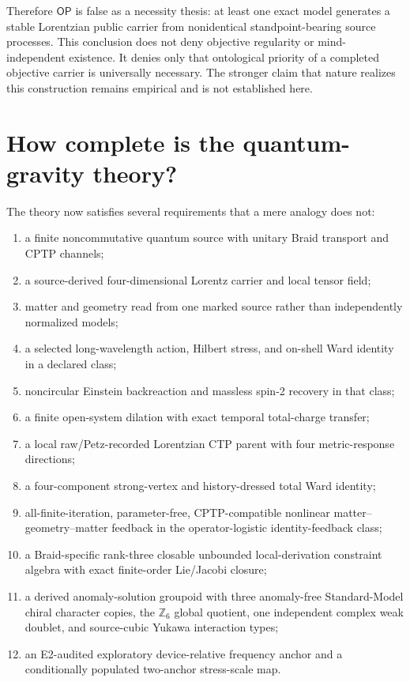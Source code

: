 \documentclass[11pt]{article}
\theoremstyle{definition}
\theoremstyle{remark}
\newcommand{\OPT}{\mathsf{OP}}
\begin{document}
Therefore $\OPT$ is false as a necessity thesis: at least one exact model generates a stable Lorentzian public carrier from nonidentical standpoint-bearing source processes. This conclusion does not deny objective regularity or mind-independent existence. It denies only that ontological priority of a completed objective carrier is universally necessary. The stronger claim that nature realizes this construction remains empirical and is not established here.

\section{How complete is the quantum-gravity theory?}

The theory now satisfies several requirements that a mere analogy does not:
\begin{enumerate}
\item a finite noncommutative quantum source with unitary Braid transport and CPTP channels;
\item a source-derived four-dimensional Lorentz carrier and local tensor field;
\item matter and geometry read from one marked source rather than independently normalized models;
\item a selected long-wavelength action, Hilbert stress, and on-shell Ward identity in a declared class;
\item noncircular Einstein backreaction and massless spin-2 recovery in that class;
\item a finite open-system dilation with exact temporal total-charge transfer;
\item a local raw/Petz-recorded Lorentzian CTP parent with four metric-response directions;
\item a four-component strong-vertex and history-dressed total Ward identity;
\item all-finite-iteration, parameter-free, CPTP-compatible nonlinear matter--geometry--matter feedback in the operator-logistic identity-feedback class;
\item a Braid-specific rank-three closable unbounded local-derivation constraint algebra with exact finite-order Lie/Jacobi closure;
\item a derived anomaly-solution groupoid with three anomaly-free Standard-Model chiral character copies, the $\mathbb Z_6$ global quotient, one independent complex weak doublet, and source-cubic Yukawa interaction types;
\item an E2-audited exploratory device-relative frequency anchor and a conditionally populated two-anchor stress-scale map.

\end{enumerate}
\end{document}
